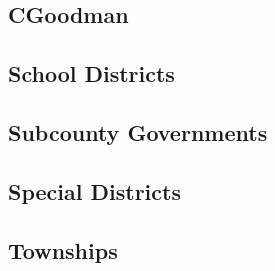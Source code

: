\documentclass{article}
\begin{document}
{	\subsection{CGoodman}
	
	\clearpage
	

	\subsection{School Districts}
	

	\clearpage
	
	\subsection{Subcounty Governments}
	
	\clearpage
	
	
	\subsection{Special Districts}
	
	\clearpage

	\subsection{Townships}
	
	\clearpage
	
}
\end{document}
